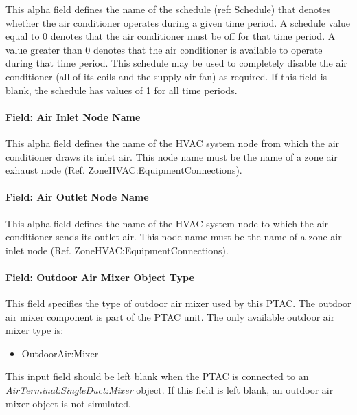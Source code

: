 This alpha field defines the name of the schedule (ref: Schedule) that denotes whether the air conditioner operates during a given time period. A schedule value equal to 0 denotes that the air conditioner must be off for that time period. A value greater than 0 denotes that the air conditioner is available to operate during that time period. This schedule may be used to completely disable the air conditioner (all of its coils and the supply air fan) as required. If this field is blank, the schedule has values of 1 for all time periods.

\paragraph{Field: Air Inlet Node Name}\label{field-air-inlet-node-name-5-001}

This alpha field defines the name of the HVAC system node from which the air conditioner draws its inlet air. This node name must be the name of a zone air exhaust node (Ref. ZoneHVAC:EquipmentConnections).

\paragraph{Field: Air Outlet Node Name}\label{field-air-outlet-node-name-5-001}

This alpha field defines the name of the HVAC system node to which the air conditioner sends its outlet air. This node name must be the name of a zone air inlet node (Ref. ZoneHVAC:EquipmentConnections).

\paragraph{Field: Outdoor Air Mixer Object Type}\label{field-outdoor-air-mixer-object-type-2}

This field specifies the type of outdoor air mixer used by this PTAC. The outdoor air mixer component is part of the PTAC unit. The only available outdoor air mixer type is:

\begin{itemize}
\tightlist
\item
  OutdoorAir:Mixer
\end{itemize}

This input field should be left blank when the PTAC is connected to an \textit{AirTerminal:SingleDuct:Mixer} object. If this field is left blank, an outdoor air mixer object is not simulated. 

